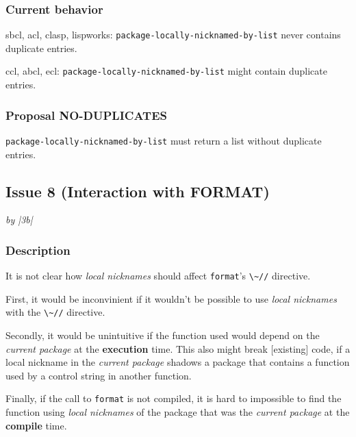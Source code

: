 \documentclass[11pt]{article}
\begin{document}
\subsubsection{Current behavior}
\label{sec:org22d451f}
sbcl, acl, clasp, lispworks:
  \texttt{package-locally-nicknamed-by-list} never contains duplicate entries.

ccl, abcl, ecl:
  \texttt{package-locally-nicknamed-by-list} might contain duplicate entries.
\subsubsection{Proposal NO-DUPLICATES}
\label{sec:org984d62a}
\texttt{package-locally-nicknamed-by-list} must return a list without duplicate entries.
\subsection{Issue 8 (Interaction with FORMAT)}
\label{sec:org1c0613b}
\emph{by |3b|}
\subsubsection{Description}
\label{sec:org7e0ea95}
It is not clear how \emph{local nicknames} should affect \texttt{format}'s \texttt{\textbackslash{}\textasciitilde{}//} directive.

First, it would be inconvinient if it wouldn't be possible to use \emph{local
nicknames} with the \texttt{\textbackslash{}\textasciitilde{}//} directive.

Secondly, it would be unintuitive if the function used would depend on the
\emph{current package} at the \textbf{execution} time. This also might break [existing] code,
if a local nickname in the \emph{current package} shadows a package that contains a
function used by a control string in another function.

Finally, if the call to \texttt{format} is not compiled, it is hard to impossible to find
the function using \emph{local nicknames} of the package that was the \emph{current package}
at the \textbf{compile} time.
\end{document}
